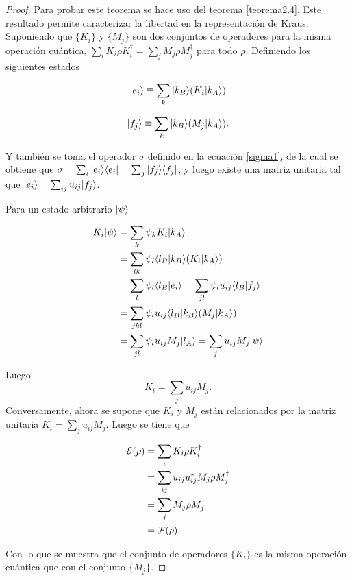 \begin{proof}
Para probar este teorema se hace uso del teorema {\ref{teorema2.4}}. Este resultado permite caracterizar la libertad en la representación de Kraus. Suponiendo que $\{K_i\}$ y $\{M_j\}$ son dos conjuntos de operadores para la misma operación cuántica, $\sum_i K_i \rho K_i^\dagger= \sum_j M_j \rho M_j^\dagger$ para todo $\rho$. Definiendo los siguientes estados

\begin{equation}
    |e_i\rangle\equiv \sum_k |k_B\rangle(K_i|k_A\rangle)
\end{equation}



\begin{equation}
    |f_j\rangle\equiv \sum_k |k_B\rangle(M_j|k_A\rangle).
\end{equation}


Y también se toma el operador $\sigma$ definido en la ecuación {\ref{sigma1}}, de la cual se obtiene que $\sigma=\sum_i|e_i \rangle \langle e_i|=\sum_j |f_j\rangle \langle f_j|$, y luego existe una matriz unitaria tal que $  |e_i\rangle=\sum_{ij}u_{ij}|f_j\rangle$.

Para un estado arbitrario $|\psi\rangle$

\begin{equation}
    \begin{split}
        K_i|\psi\rangle&=\sum_k \psi_k K_i|k_A\rangle\\
                   &= \sum_{lk}\psi_l\langle l_B |k_B\rangle(K_i|k_A\rangle)\\
                   &=\sum_{l}\psi_l\langle l_B| e_i\rangle=\sum_{jl}\psi_l u_{ij}\langle l_B|f_j\rangle\\
                   &=\sum_{jkl}\psi_l u_{ij}\langle l_B|k_B\rangle(M_j|k_A\rangle)\\
                   &=\sum_{jl}\psi_l u_{ij}M_j|l_A\rangle=\sum_j u_{ij} M_j |\psi\rangle\\
    \end{split}
\end{equation}


Luego \[K_i=\sum_j u_{ij}M_j.\] Conversamente, ahora se supone que $K_i$ y $M_j$ están relacionados por la matriz unitaria $K_i=\sum_j u_{ij}M_j$. Luego se tiene que



\begin{equation}
    \begin{split}
        \mathcal{E}(\rho)&=\sum_i  K_i\rho K_i^\dagger\\
            &=\sum_{ij} u_{ij}u_{ij}^*M_j\rho M_j^\dagger\\
            &=\sum_j M_j\rho M_j^\dagger\\
            &=\mathcal{F}(\rho).
    \end{split}
\end{equation}

Con lo que se muestra que el conjunto de operadores $\{K_i\}$ es la misma operación cuántica que con el conjunto $\{M_j\}$.








\end{proof}

